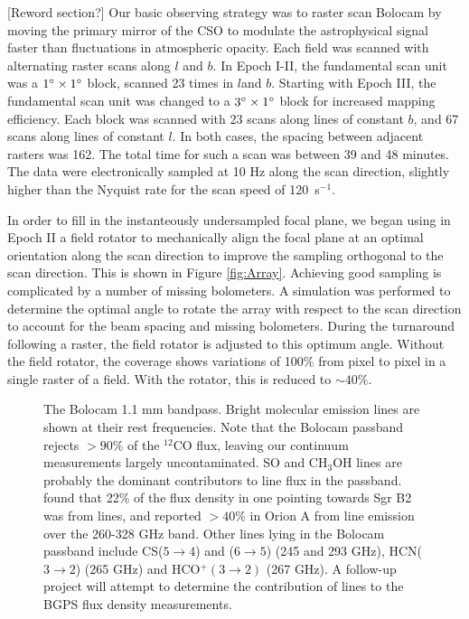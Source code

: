 \documentclass[12pt,preprint]{aastex}
\newcommand{\lon}{\ensuremath{l}}
\def\Figure#1#2#3#4{
\begin{figure}[htb]
\epsscale{#4}
\plotone{#1}
\caption{#2}
\label{#3}
\end{figure}
}
\begin{document}
[Reword section?] Our basic observing strategy was to raster scan Bolocam by moving the
primary mirror of the CSO to modulate the astrophysical signal faster
than fluctuations in atmospheric opacity.  Each field was scanned with
alternating raster scans along $l$ and $b$.  In Epoch I-II, the fundamental
scan unit was a $1\mbox{$^\circ$} \times 1\mbox{$^\circ$}$ block, scanned 23 times in \lon and
$b$.  Starting with Epoch III, the fundamental scan unit was changed to a
$3\mbox{$^\circ$} \times 1\mbox{$^\circ$}$ block for increased mapping efficiency.  Each block
was scanned with 23 scans along lines of constant $b$, and 67 scans along lines
of constant $l$.  In both cases, the spacing between adjacent rasters was
162\arcsec.  The total time for such a scan was between 39 and 48 minutes.  The
data were electronically sampled at 10 Hz along the scan direction, slightly
higher than the Nyquist rate for the scan speed of 120\arcsec\ s$^{-1}$.


In order to fill in the instanteously undersampled focal plane, we
began using in Epoch II a field rotator to mechanically align the
focal plane at an optimal orientation along the scan direction to
improve the sampling orthogonal to the scan direction.  This is shown
in Figure \ref{fig:Array}.  Achieving good sampling is complicated by
a number of missing bolometers.  A simulation was performed to determine
the optimal angle to rotate the array with respect to the scan
direction to account for the beam spacing and missing bolometers.  During
the turnaround following a raster, the field rotator is adjusted to
this optimum angle.
Without the field rotator, the coverage shows variations of 100\% from
pixel to pixel in a single raster of a field.  With the rotator, this
is reduced to $\sim40\%$.  


\Figure{bolocam_bandpass}{The Bolocam 1.1 mm bandpass.  Bright molecular
emission lines are shown at their rest frequencies.  Note that the Bolocam
passband rejects $>90\%$ of the $^{12}$CO flux, leaving our continuum
measurements largely uncontaminated.  SO and CH$_3$OH lines are probably the
dominant contributors to line flux in the passband.  \citet{nummelin1998} found
that 22\% of the flux density in one pointing towards Sgr B2 was from lines,
and \citet{yoshida2005} reported $>40\%$ in Orion A from line emission over the
260-328 GHz band. Other lines lying in the Bolocam passband include CS($5\to4$)
and ($6\to5$) (245 and 293 GHz), HCN($3\to2$) (265 GHz) and HCO$^+(3\to2)$ (267
GHz).  A follow-up project will attempt to determine the contribution of lines
to the BGPS flux density measurements.}
{fig:Bandpass}{1.0}
\end{document}
